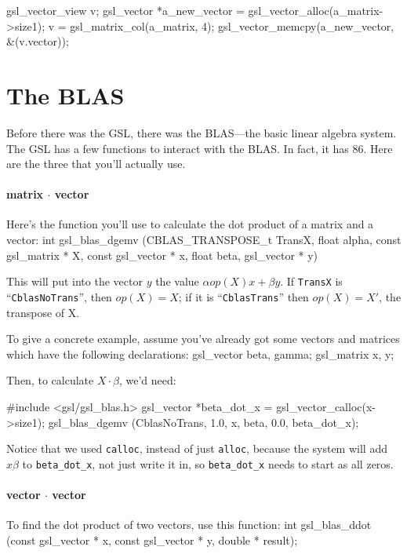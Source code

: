 gsl_vector_view v;
gsl_vector *a_new_vector = gsl_vector_alloc(a_matrix->size1);
v = gsl_matrix_col(a_matrix, 4);
gsl_vector_memcpy(a_new_vector, &(v.vector));



\section{The BLAS} 
Before there was the GSL, there was the BLAS---the basic linear algebra system. The GSL has a few
functions to interact with the BLAS. In fact, it has 86. Here are the three that you'll
actually use.

\paragraph{matrix $\cdot$ vector} Here's the function you'll use to calculate the dot product of a
matrix and a vector:
int gsl_blas_dgemv (CBLAS_TRANSPOSE_t TransX, float alpha, 
          const gsl_matrix * X, const gsl_vector * x, 
          float beta, gsl_vector * y)

This will put into the vector $y$ the value $\alpha op(X) x + \beta y$. 
If {\tt TransX} is ``{\tt CblasNoTrans}'',  then $op(X)=X$; if it is
``{\tt CblasTrans}'' then $op(X)=X'$, the transpose of X.


To give a concrete example, assume you've already got some vectors and matrices which have the following
declarations:
gsl_vector beta, gamma;     
gsl_matrix x, y;           

Then, to calculate $X\cdot \beta$, we'd need:

#include <gsl/gsl_blas.h>
gsl_vector *beta_dot_x      = gsl_vector_calloc(x->size1);
gsl_blas_dgemv (CblasNoTrans, 1.0, x, beta, 0.0, beta_dot_x);

Notice that we used {\tt calloc}, instead of just {\tt alloc}, because
the system will add $x\beta$ to {\tt beta\_dot\_x}, not just write it in,
so {\tt beta\_dot\_x} needs to start as all zeros.

\paragraph{vector $\cdot$ vector}
To find the dot product of two vectors, use this function:
int gsl_blas_ddot (const gsl_vector * x, const gsl_vector * y, 
                                        double * result);

